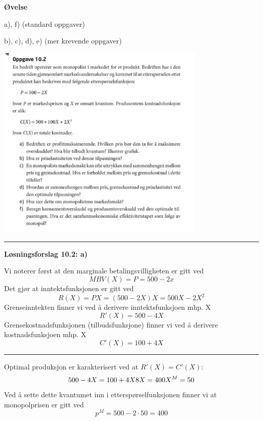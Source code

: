 \documentclass[
  letterpaper,
  DIV=11,
  numbers=noendperiod]{scrartcl}
\begin{document}
\textbf{Øvelse}

a), f) (standard oppgaver)

b), c), d), e) (mer krevende oppgaver)

\includegraphics[width=0.75\textwidth,height=\textheight]{drawio/10.2.png}

\begin{center}\rule{0.5\linewidth}{0.5pt}\end{center}

\textbf{Løsningsforslag 10.2: a)}

Vi noterer først at den marginale betalingsvilligheten er gitt ved
\begin{equation*}
MBV(X) = P = 500 -2x
\end{equation*} Det gjør at inntektsfunksjonen er gitt ved
\begin{equation*}
R(X)=PX=(500-2X)X=500X-2X^2
\end{equation*} Grenseinntekten finner vi ved å derivere
inntektsfunksjoen mhp. X \begin{equation*}
R'(X)=500-4X
\end{equation*} Grensekostnadsfunksjonen (tilbudsfunksjone) finner vi
ved å derivere kostnadsfunksjoen mhp. X \begin{equation*}
C'(X) = 100+4X
\end{equation*}

\begin{center}\rule{0.5\linewidth}{0.5pt}\end{center}

Optimal produksjon er karakterisert ved at \(R'(X)=C'(X)\):
\begin{equation*}
500-4X = 100+4X \\ 
8X = 400 \\
X^{M} = 50
\end{equation*} Ved å sette dette kvantumet inn i etterspørselfunksjonen
finner vi at monopolprisen er gitt ved \begin{equation*}
p^{M}= 500-2\cdot 50 = 400
\end{equation*}
\end{document}
